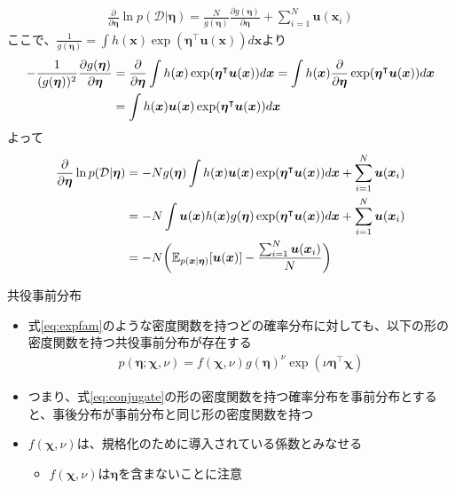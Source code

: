 \documentclass[aspectratio=169,unicode,dvipdfmx,14pt]{beamer}
\begin{document}
\begin{frame}
\FontMath
\vspace{-.1in}
\begin{align}
\frac{\partial}{\partial \bm{\eta}} \ln p(\mathcal{D}|\bm{\eta}) 
= \frac{N}{g(\bm{\eta})} \frac{\partial g(\bm{\eta})}{\partial \bm{\eta}}
+ \sum_{i=1}^N \bm{u}(\bm{x}_i)
\end{align}
ここで、$\frac{1}{g(\bm{\eta})} = \int h(\bm{x}) \exp(\bm{\eta}^\intercal \bm{u}(\bm{x})) d \bm{x}$より
\begin{align}
- \frac{1}{(g(\bm{\eta}))^2} \frac{\partial g(\bm{\eta})}{\partial \bm{\eta}}
& = \frac{\partial }{\partial \bm{\eta}} \int h(\bm{x}) \exp(\bm{\eta}^\intercal \bm{u}(\bm{x})) d \bm{x}
= \int h(\bm{x}) \frac{\partial }{\partial \bm{\eta}} \exp(\bm{\eta}^\intercal \bm{u}(\bm{x})) d \bm{x}
\notag \\ &
= \int h(\bm{x}) \bm{u}(\bm{x})\exp(\bm{\eta}^\intercal \bm{u}(\bm{x})) d \bm{x}
\end{align}
よって
\begin{align}
\frac{\partial}{\partial \bm{\eta}} \ln p(\mathcal{D}|\bm{\eta}) 
& = - N g(\bm{\eta}) \int h(\bm{x}) \bm{u}(\bm{x})\exp(\bm{\eta}^\intercal \bm{u}(\bm{x})) d \bm{x}
+ \sum_{i=1}^N \bm{u}(\bm{x}_i)
\notag \\ &
= - N \int \bm{u}(\bm{x}) h(\bm{x}) g(\bm{\eta}) \exp(\bm{\eta}^\intercal \bm{u}(\bm{x})) d \bm{x}
+ \sum_{i=1}^N \bm{u}(\bm{x}_i)
\notag \\ &
= - N \bigg( \mathbb{E}_{p(\bm{x}|\bm{\eta})} [\bm{u}(\bm{x})] - \frac{ \sum_{i=1}^N \bm{u}(\bm{x}_i) }{N} \bigg)
\end{align}
\end{frame}


\begin{frame}{共役事前分布}
\begin{itemize}
\item 式\eqref{eq:expfam}のような密度関数を持つどの確率分布に対しても、以下の形の密度関数を持つ共役事前分布が存在する
\begin{align}
p(\bm{\eta};\bm{\chi},\nu) = f(\bm{\chi}, \nu) g(\bm{\eta})^\nu \exp(\nu\bm{\eta}^\intercal\bm{\chi})
\label{eq:conjugate}
\end{align}
\item つまり、式\eqref{eq:conjugate}の形の密度関数を持つ確率分布を事前分布とすると、事後分布が事前分布と同じ形の密度関数を持つ
\item $f(\bm{\chi}, \nu)$は、規格化のために導入されている係数とみなせる
\begin{itemize}
\item $f(\bm{\chi}, \nu)$は$\bm{\eta}$を含まないことに注意
\end{itemize}
\end{itemize}
\end{frame}
\end{document}
